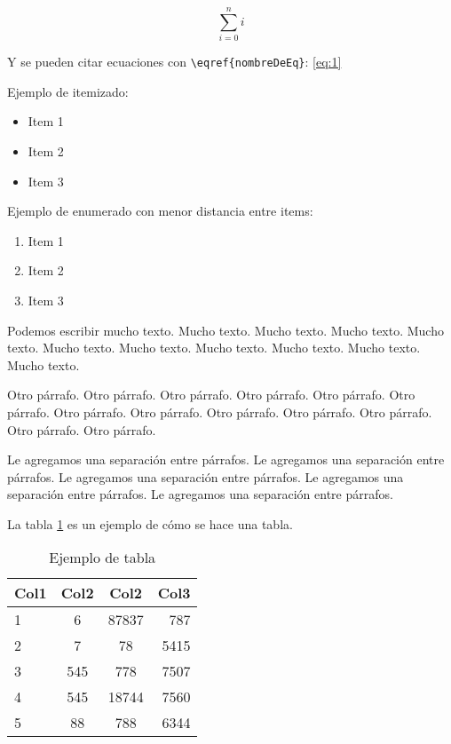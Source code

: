 \documentclass[10pt,a4paper]{article}
\begin{document}
\maketitle


\begin{equation}
	\sum\limits_{i=0}^{n} i
	\label{eq:1}
\end{equation}

Y se pueden citar ecuaciones con \verb|\eqref{nombreDeEq}|: \eqref{eq:1}

Ejemplo de itemizado:

\begin{itemize}
	\item Item 1
	\item Item 2
	\item Item 3
\end{itemize}

Ejemplo de enumerado con menor distancia entre items:

\begin{enumerate} \setlength\itemsep{0cm}
	\item Item 1
	\item Item 2
	\item Item 3
\end{enumerate}

Podemos escribir mucho texto. Mucho texto. Mucho texto. Mucho texto. Mucho texto. Mucho texto. Mucho texto. Mucho texto. Mucho texto. Mucho texto. Mucho texto.

Otro párrafo. Otro párrafo. Otro párrafo. Otro párrafo. Otro párrafo. Otro párrafo. Otro párrafo. Otro párrafo. Otro párrafo. Otro párrafo. Otro párrafo. Otro párrafo. Otro párrafo.

\vspace{0.3cm}

Le agregamos una separación entre párrafos. Le agregamos una separación entre párrafos. Le agregamos una separación entre párrafos. Le agregamos una separación entre párrafos. Le agregamos una separación entre párrafos.

\vspace{0.3cm}

La tabla \ref{tab:ejemplo} es un ejemplo de cómo se hace una tabla.

\begin{table}[h!]
	\centering
	\begin{tabular}{||l c c r||} 
		\hline
		Col1 & Col2 & Col2 & Col3 \\ [0.5ex] 
		\hline\hline
		1 & 6 & 87837 & 787 \\ 
		2 & 7 & 78 & 5415 \\
		3 & 545 & 778 & 7507 \\
		4 & 545 & 18744 & 7560 \\
		5 & 88 & 788 & 6344 \\
		\hline
	\end{tabular}
	\caption{Ejemplo de tabla}
	\label{tab:ejemplo}
\end{table}
\end{document}
